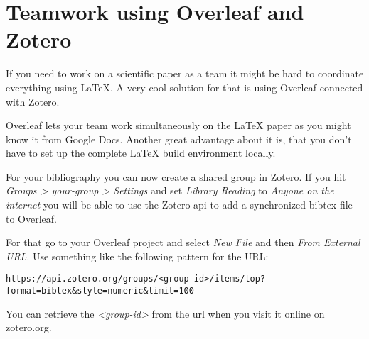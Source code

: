 \documentclass{article}
\begin{document}
  \section{Teamwork using Overleaf and Zotero}

  If you need to work on a scientific paper as a team it might be hard to
  coordinate everything using LaTeX.
  A very cool solution for that is using Overleaf connected with Zotero.

  Overleaf lets your team work simultaneously on the LaTeX paper as you might
  know it from Google Docs.
  Another great advantage about it is, that you don't have to set up the complete
  LaTeX build environment locally.

  For your bibliography you can now create a shared group in Zotero.
  If you hit \textit{Groups > your-group > Settings} and set \textit{Library Reading}
  to \textit{Anyone on the internet} you will be able to use the Zotero api to
  add a synchronized bibtex file to Overleaf.

  For that go to your Overleaf project and select \textit{New File} and then
  \textit{From External URL}.
  Use something like the following pattern for the URL:

  \begin{lstlisting}
https://api.zotero.org/groups/<group-id>/items/top?format=bibtex&style=numeric&limit=100
  \end{lstlisting}

  You can retrieve the \textit{<group-id>} from the url when you visit it online on
  zotero.org.
\end{document}
